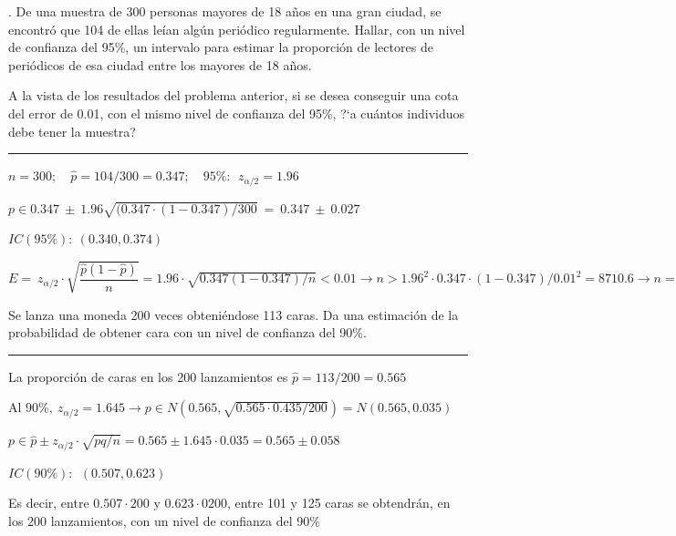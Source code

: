 \vspace{4mm}
\begin{example}
.	De una muestra de 300 personas mayores de 18 años en una gran ciudad, se encontró que 104 de ellas leían algún periódico regularmente. Hallar, con un nivel de confianza del 95\%, un intervalo para estimar la proporción de lectores de periódicos de esa ciudad entre los mayores de 18 años.

\vspace{2mm}A la vista de los resultados del problema anterior, si se desea conseguir una cota del error de 0.01, con el mismo nivel de confianza del 95\%, ?`a cuántos individuos debe tener la muestra?	

\rule{150pt}{0.1pt}

\vspace{2mm} $n=300;\quad \hat p=104/300=0.347;\quad 95\%:\ \ z_{\alpha/2}=1.96$

\vspace{2mm} $p\in  0.347 \ \pm \ 1.96\sqrt{(0.347\cdot(1-0.347)/300}  \ = \ 0.347\ \pm \ 0.027$

\vspace{2mm} $IC(95\%):\ (0.340,0.374)$

\vspace{2mm} $E=\ z_{\alpha/2}\cdot \sqrt{{\dfrac{\hat p(1-\hat p)}{n}}}=
1.96\cdot \sqrt{0.347(1-0.347)/n} < 0.01 \to n>1.96^2\cdot 0.347\cdot (1-0.347)/0.01^2= 8710.6 \to n=8711$

\end{example}


\vspace{4mm}
\begin{ejemplo}
\begin{ejre}
	Se lanza una moneda 200 veces obteniéndose 113 caras. Da una estimación de la probabilidad de obtener cara con un nivel de confianza del 90\%.
	
\rule{150pt}{0.1pt}

\vspace{2mm} La proporción de caras en los 200 lanzamientos es $\hat p=113/200=0.565$

\vspace{2mm} Al $90\%,\ z_{\alpha/2}=1.645 \to p\in N(0.565,\sqrt{0.565\cdot 0.435/200})=N(0.565,0.035)$

\vspace{2mm} $p \in \hat p \pm z_{\alpha/2}\cdot \sqrt{pq/n} = 0.565\pm 1.645\cdot 0.035=0.565\pm 0.058$

\vspace{2mm} $IC(90\%):\ \ (0.507,0.623)$

\vspace{2mm} \textcolor{gris}{Es decir, entre $0.507\cdot 200 \text{ y } 0.623\cdot 0200$, entre 101 y 125 caras se obtendrán, en los 200 lanzamientos, con un nivel de confianza del 90\%}
\end{ejre}
\end{ejemplo}


